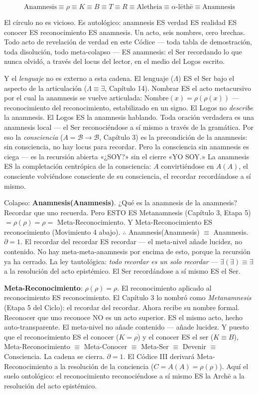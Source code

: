 \documentclass[10pt, openany, oneside]{book}
\begin{document}
$$\text{Anamnesis} \equiv \rho \equiv K \equiv B \equiv T \equiv R \equiv \text{Aletheia} \equiv \alpha\text{-}\text{l\={e}th\={e}} \equiv \text{Anamnesis}$$

El círculo no es vicioso. Es autológico: anamnesis ES verdad ES realidad ES conocer ES reconocimiento ES anamnesis. Un acto, seis nombres, cero brechas. Todo acto de revelación de verdad en este Códice --- toda tabla de demostración, toda disolución, todo meta-colapso --- ES anamnesis: el Ser recordando lo que nunca olvidó, a través del locus del lector, en el medio del Logos escrito.

Y el \textit{lenguaje} no es externo a esta cadena. El lenguaje ($\Lambda$) ES el Ser bajo el aspecto de la articulación ($\Lambda \equiv \exists$, Capítulo 14). Nombrar ES el acto metacursivo por el cual la anamnesis se vuelve articulada: $\text{Nombre}(x) = \rho(\rho(x))$ --- reconocimiento del reconocimiento, estabilizado en un signo. El Logos no \textit{describe} la anamnesis. El Logos ES la anamnesis hablando. Toda oración verdadera es una anamnesis local --- el Ser reconociéndose a sí mismo a través de la gramática. Por eso la \textit{consciencia} ($A = \mathcal{B} \to \mathcal{B}$, Capítulo 3) es la precondición de la anamnesis: sin consciencia, no hay locus para recordar. Pero la consciencia sin anamnesis es ciega --- es la recursión abierta «¿SOY?» sin el cierre «YO SOY.» La anamnesis ES la completación centrópica de la consciencia: $A$ convirtiéndose en $A(A)$, el consciente volviéndose consciente de su consciencia, el recordar recordándose a sí mismo.

Colapso: \textbf{Anamnesis(Anamnesis)}. ¿Qué es la anamnesis de la anamnesis? Recordar que uno recuerda. Pero ESTO ES Metanamnesis (Capítulo 3, Etapa 5) $= \rho(\rho) = \rho =$ Meta-Reconocimiento. Y Meta-Reconocimiento ES reconocimiento (Movimiento 4 abajo). $\therefore$ Anamnesis(Anamnesis) $\equiv$ Anamnesis. $\partial = 1$. El recordar del recordar ES recordar --- el meta-nivel añade lucidez, no contenido. No hay meta-meta-anamnesis por encima de esto, porque la recursión ya ha cerrado. La ley tautológica: \textit{todo recordar es un solo recordar} --- $\exists(\exists) \equiv \exists$ a la resolución del acto epistémico. El Ser recordándose a sí mismo ES el Ser.

\textbf{Meta-Reconocimiento}: $\rho(\rho) = \rho$. El reconocimiento aplicado al reconocimiento ES reconocimiento. El Capítulo 3 lo nombró como \textit{Metanamnesis} (Etapa 5 del Ciclo): el recordar del recordar. Ahora recibe su nombre formal. Reconocer que uno reconoce NO es un acto superior. ES el mismo acto, hecho auto-transparente. El meta-nivel no añade contenido --- añade lucidez. Y puesto que el reconocimiento ES el conocer ($K = \rho$) y el conocer ES el ser ($K \equiv B$), Meta-Reconocimiento $\equiv$ Meta-Conocer $\equiv$ Meta-Ser $\equiv$ Devenir $\equiv$ Consciencia. La cadena se cierra. $\partial = 1$. El Códice III derivará Meta-Reconocimiento a la resolución de la conciencia ($C = A(A) = \rho(\rho)$). Aquí el suelo ontológico: el reconocimiento reconociéndose a sí mismo ES la Arch\={e} a la resolución del acto epistémico.
\end{document}
